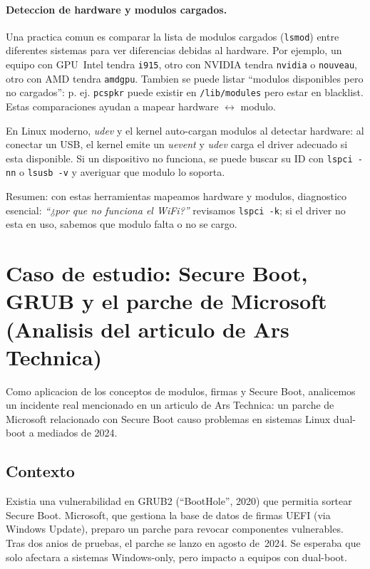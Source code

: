 \paragraph{Deteccion de hardware y modulos cargados.}  
Una practica comun es comparar la lista de modulos cargados (\texttt{lsmod}) entre diferentes sistemas para ver diferencias debidas al hardware. Por ejemplo, un equipo con GPU~Intel tendra \texttt{i915}, otro con NVIDIA tendra \texttt{nvidia} o \texttt{nouveau}, otro con AMD tendra \texttt{amdgpu}. Tambien se puede listar ``modulos disponibles pero no cargados'': p. ej. \texttt{pcspkr} puede existir en \texttt{/lib/modules} pero estar en blacklist. Estas comparaciones ayudan a mapear hardware $\leftrightarrow$ modulo.

En Linux moderno, \emph{udev} y el kernel auto-cargan modulos al detectar hardware: al conectar un USB, el kernel emite un \emph{uevent} y \emph{udev} carga el driver adecuado si esta disponible. Si un dispositivo no funciona, se puede buscar su ID con \texttt{lspci -nn} o \texttt{lsusb -v} y averiguar que modulo lo soporta.

Resumen: con estas herramientas mapeamos hardware y modulos, diagnostico esencial: \emph{``¿por que no funciona el WiFi?''} \textrightarrow{} revisamos \texttt{lspci -k}; si el driver no esta en uso, sabemos que modulo falta o no se cargo.

\section{Caso de estudio: Secure Boot, GRUB y el parche de Microsoft (Analisis del articulo de Ars Technica)}

Como aplicacion de los conceptos de modulos, firmas y Secure Boot, analicemos un incidente real mencionado en un articulo de Ars Technica: un parche de Microsoft relacionado con Secure Boot causo problemas en sistemas Linux dual-boot a mediados de 2024.

\subsection*{Contexto}

Existia una vulnerabilidad en GRUB2 (``BootHole'', 2020) que permitia sortear Secure Boot. Microsoft, que gestiona la base de datos de firmas UEFI (via Windows Update), preparo un parche para revocar componentes vulnerables. Tras dos anios de pruebas, el parche se lanzo en agosto de~2024. Se esperaba que solo afectara a sistemas Windows-only, pero impacto a equipos con dual-boot.

